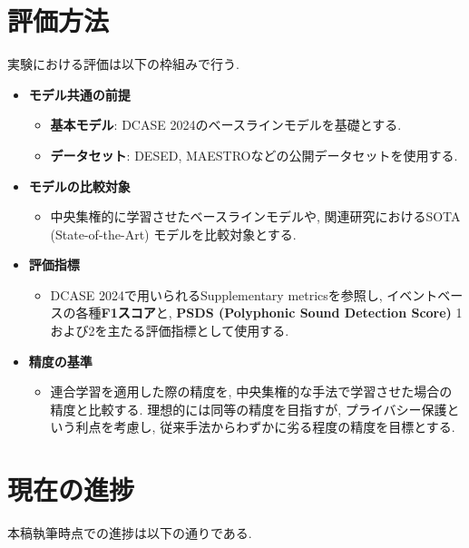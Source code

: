 \documentclass[dvipdfmx, twocolumn, 10pt]{bxjsarticle}
\begin{document}
\section{評価方法}
実験における評価は以下の枠組みで行う.

\begin{itemize}
    \item \textbf{モデル共通の前提}
    \begin{itemize}
        \item \textbf{基本モデル}: DCASE 2024のベースラインモデルを基礎とする.
        \item \textbf{データセット}: DESED, MAESTROなどの公開データセットを使用する.
    \end{itemize}
    
    \item \textbf{モデルの比較対象}
    \begin{itemize}
        \item 中央集権的に学習させたベースラインモデルや, 関連研究におけるSOTA (State-of-the-Art) モデルを比較対象とする.
    \end{itemize}
    
    \item \textbf{評価指標}
    \begin{itemize}
        \item DCASE 2024で用いられるSupplementary metricsを参照し, イベントベースの各種\textbf{F1スコア}と, \textbf{PSDS (Polyphonic Sound Detection Score)} 1および2を主たる評価指標として使用する.
    \end{itemize}

    \item \textbf{精度の基準}
    \begin{itemize}
        \item 連合学習を適用した際の精度を, 中央集権的な手法で学習させた場合の精度と比較する. 理想的には同等の精度を目指すが, プライバシー保護という利点を考慮し, 従来手法からわずかに劣る程度の精度を目標とする.
    \end{itemize}
\end{itemize}


\section{現在の進捗}
本稿執筆時点での進捗は以下の通りである.
\end{document}

